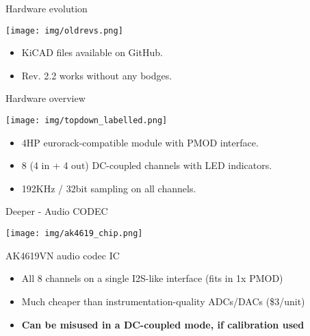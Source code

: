 \documentclass[aspectratio=169]{beamer}
\begin{document}
\begin{frame}{Hardware evolution}
    \begin{center}
        \texttt{[image: img/oldrevs.png]}
    \end{center}
    \begin{itemize}
        \item KiCAD files available on GitHub.
        \item Rev. 2.2 works without any bodges.
    \end{itemize}
\end{frame}

\begin{frame}{Hardware overview}
    \begin{center}
        \texttt{[image: img/topdown\_labelled.png]}
    \end{center}
    \begin{itemize}
        \item 4HP eurorack-compatible module with PMOD interface.
        \item 8 (4 in + 4 out) DC-coupled channels with LED indicators.
        \item 192KHz / 32bit sampling on all channels.
    \end{itemize}
\end{frame}

\begin{frame}{Deeper - Audio CODEC}
    \begin{center}
        \texttt{[image: img/ak4619\_chip.png]}
    \end{center}
    \begin{block}{AK4619VN audio codec IC}
        \begin{itemize}
            \item All 8 channels on a single I2S-like interface (fits in 1x PMOD)
            \item Much cheaper than instrumentation-quality ADCs/DACs (\$3/unit)
            \item \textbf{Can be misused in a DC-coupled mode, if calibration used}
        \end{itemize}
    \end{block}
\end{frame}
\end{document}
